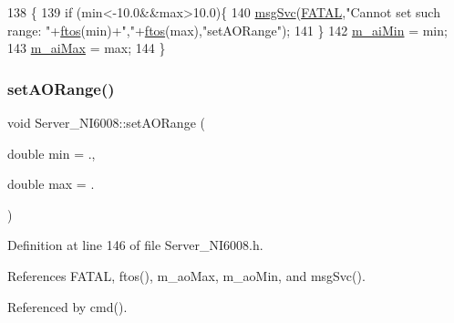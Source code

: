 \begin{DoxyCode}
138                                                   \{
139     \textcolor{keywordflow}{if} (min<-10.0&&max>10.0)\{
140     \hyperlink{classServer__NI6008_a140d5f91d6c0f4fb963ecf747e44df78}{msgSvc}(\hyperlink{classServer__NI6008_af1e3e3bac26355a746b5d2e548fe25bea678aa96ea2189f7d6ab602160fa49b8b}{FATAL},\textcolor{stringliteral}{"Cannot set such range: "}+\hyperlink{Server__NI6008_8h_ad2603c89b82a1609399d9c9257f947f7}{ftos}(min)+\textcolor{stringliteral}{","}+\hyperlink{Server__NI6008_8h_ad2603c89b82a1609399d9c9257f947f7}{ftos}(max),\textcolor{stringliteral}{"setAORange"});
141     \}
142     \hyperlink{classServer__NI6008_af0fea276566b46d56f235bece151af78}{m\_aiMin} = min;
143     \hyperlink{classServer__NI6008_aa871878e7792bd5dc002f64ef7575dd4}{m\_aiMax} = max;
144   \}
\end{DoxyCode}
\mbox{\label{classServer__NI6008_aec1596005b4c75cc2c13d87ab3d9d120}} 
\subsubsection{\texorpdfstring{set\+A\+O\+Range()}{setAORange()}}
{\footnotesize\ttfamily void Server\+\_\+\+N\+I6008\+::set\+A\+O\+Range (\begin{DoxyParamCaption}\item[{double}]{min = {.},  }\item[{double}]{max = {.} }\end{DoxyParamCaption})\hspace{0.3cm}{\ttfamily [inline]}}



Definition at line 146 of file Server\+\_\+\+N\+I6008.\+h.



References F\+A\+T\+AL, ftos(), m\+\_\+ao\+Max, m\+\_\+ao\+Min, and msg\+Svc().



Referenced by cmd().


